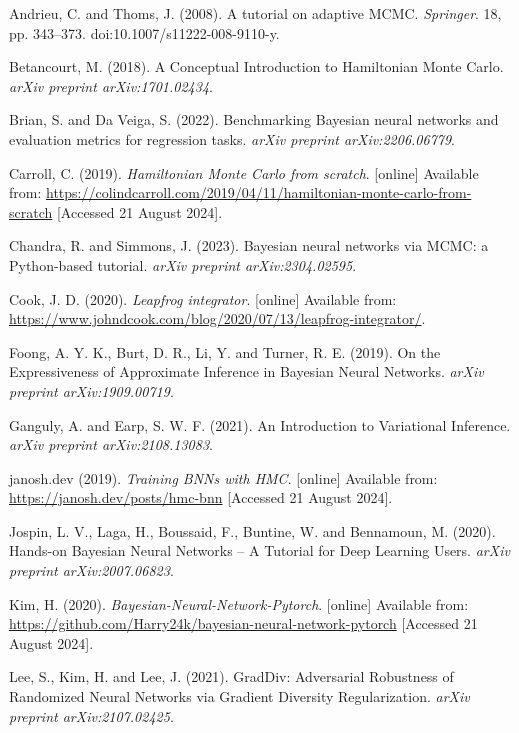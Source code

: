 \documentclass[conference]{IEEEtran}
\begin{document}
\begin{thebibliography}{00}

 Andrieu, C. and Thoms, J. (2008). A tutorial on adaptive MCMC. \textit{Springer}. 18, pp. 343–373. doi:10.1007/s11222-008-9110-y.

 Betancourt, M. (2018). A Conceptual Introduction to Hamiltonian Monte Carlo. \textit{arXiv preprint arXiv:1701.02434}.

 Brian, S. and Da Veiga, S. (2022). Benchmarking Bayesian neural networks and evaluation metrics for regression tasks. \textit{arXiv preprint arXiv:2206.06779}.

 Carroll, C. (2019). \textit{Hamiltonian Monte Carlo from scratch}. [online] Available from: \url{https://colindcarroll.com/2019/04/11/hamiltonian-monte-carlo-from-scratch} [Accessed 21 August 2024].

 Chandra, R. and Simmons, J. (2023). Bayesian neural networks via MCMC: a Python-based tutorial. \textit{arXiv preprint arXiv:2304.02595}.

 Cook, J. D. (2020). \textit{Leapfrog integrator}. [online] Available from: \url{https://www.johndcook.com/blog/2020/07/13/leapfrog-integrator/}.

 Foong, A. Y. K., Burt, D. R., Li, Y. and Turner, R. E. (2019). On the Expressiveness of Approximate Inference in Bayesian Neural Networks. \textit{arXiv preprint arXiv:1909.00719}.

 Ganguly, A. and Earp, S. W. F. (2021). An Introduction to Variational Inference. \textit{arXiv preprint arXiv:2108.13083}.

 janosh.dev (2019). \textit{Training BNNs with HMC}. [online] Available from: \url{https://janosh.dev/posts/hmc-bnn} [Accessed 21 August 2024].

 Jospin, L. V., Laga, H., Boussaid, F., Buntine, W. and Bennamoun, M. (2020). Hands-on Bayesian Neural Networks – A Tutorial for Deep Learning Users. \textit{arXiv preprint arXiv:2007.06823}.

 Kim, H. (2020). \textit{Bayesian-Neural-Network-Pytorch}. [online] Available from: \url{https://github.com/Harry24k/bayesian-neural-network-pytorch} [Accessed 21 August 2024].

 Lee, S., Kim, H. and Lee, J. (2021). GradDiv: Adversarial Robustness of Randomized Neural Networks via Gradient Diversity Regularization. \textit{arXiv preprint arXiv:2107.02425}.


\end{thebibliography}
\end{document}
